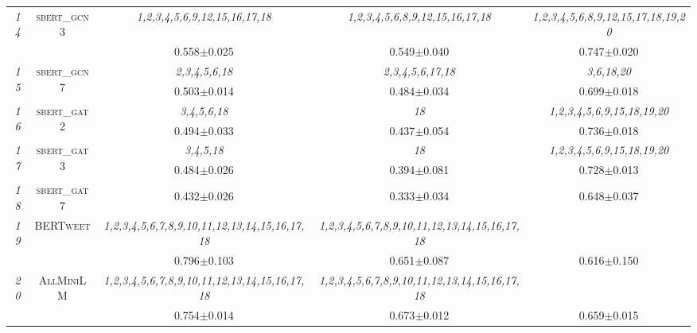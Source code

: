 \begin{table}[h]
{\begin{tabular}{ccccc}
        \multirow{2}{*}{\textit{14}} & \multirow{2}{*}{\textsc{sbert_gcn3}} & \textit{1,2,3,4,5,6,9,12,15,16,17,18} \cellcolor{gray!10} & \textit{1,2,3,4,5,6,8,9,12,15,16,17,18} & \textit{1,2,3,4,5,6,8,9,12,15,17,18,19,20} \cellcolor{gray!10} \\
        & & 0.558$\pm$0.025 \cellcolor{gray!10} & 0.549$\pm$0.040 & 0.747$\pm$0.020 \cellcolor{gray!10} \\ \hline
        \multirow{2}{*}{\textit{15}} & \multirow{2}{*}{\textsc{sbert_gcn7}} & \textit{2,3,4,5,6,18} \cellcolor{gray!10} & \textit{2,3,4,5,6,17,18} & \textit{3,6,18,20} \cellcolor{gray!10} \\
        & & 0.503$\pm$0.014 \cellcolor{gray!10} & 0.484$\pm$0.034 & 0.699$\pm$0.018 \cellcolor{gray!10} \\ \hline
        \multirow{2}{*}{\textit{16}} & \multirow{2}{*}{\textsc{sbert_gat2}} & \textit{3,4,5,6,18} \cellcolor{gray!10} & \textit{18} & \textit{1,2,3,4,5,6,9,15,18,19,20} \cellcolor{gray!10} \\
        & & 0.494$\pm$0.033 \cellcolor{gray!10} & 0.437$\pm$0.054 & 0.736$\pm$0.018 \cellcolor{gray!10} \\ \hline
        \multirow{2}{*}{\textit{17}} & \multirow{2}{*}{\textsc{sbert_gat3}} & \textit{3,4,5,18} \cellcolor{gray!10} & \textit{18} & \textit{1,2,3,4,5,6,9,15,18,19,20} \cellcolor{gray!10} \\
        & & 0.484$\pm$0.026 \cellcolor{gray!10} & 0.394$\pm$0.081 & 0.728$\pm$0.013 \cellcolor{gray!10} \\ \hline
        \multirow{2}{*}{\textit{18}} & \multirow{2}{*}{\textsc{sbert_gat7}} & \cellcolor{gray!10} &  & \cellcolor{gray!10} \\
        & & 0.432$\pm$0.026 \cellcolor{gray!10} & 0.333$\pm$0.034 & 0.648$\pm$0.037 \cellcolor{gray!10} \\ \hline
        \multirow{2}{*}{\textit{19}} & \multirow{2}{*}{\textsc{BERTweet}} & \textit{1,2,3,4,5,6,7,8,9,10,11,12,13,14,15,16,17,18} \cellcolor{gray!10} & \textit{1,2,3,4,5,6,7,8,9,10,11,12,13,14,15,16,17,18} & \cellcolor{gray!10} \\
        & & 0.796$\pm$0.103 \cellcolor{gray!10} & 0.651$\pm$0.087 & 0.616$\pm$0.150 \cellcolor{gray!10} \\ \hline
        \multirow{2}{*}{\textit{20}} & \multirow{2}{*}{\textsc{AllMiniLM}} & \textit{1,2,3,4,5,6,7,8,9,10,11,12,13,14,15,16,17,18} \cellcolor{gray!10} & \textit{1,2,3,4,5,6,7,8,9,10,11,12,13,14,15,16,17,18} & \cellcolor{gray!10} \\
        & & 0.754$\pm$0.014 \cellcolor{gray!10} & 0.673$\pm$0.012 & 0.659$\pm$0.015 \cellcolor{gray!10} \\ \hline
    \end{tabular}%
    }
    \label{tab:hateXplain}
\end{table}